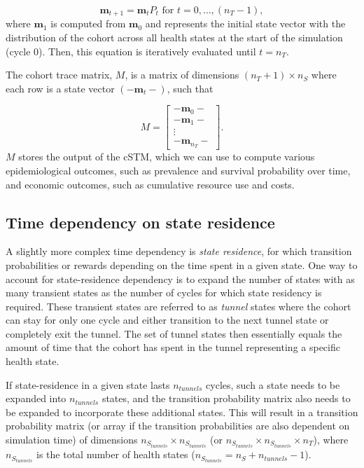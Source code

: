 \documentclass[
]{article}
\begin{document}
\[
  \mathbf{m}_{t+1} = \mathbf{m}_{t} P_t \text{ for } t = 0,\ldots, (n_T - 1),
\]
where \(\mathbf{m}_1\) is computed from \(\mathbf{m}_{0}\) and represents the initial state vector with the distribution of the cohort across all health states at the start of the simulation (cycle 0). Then, this equation is iteratively evaluated until \(t = n_T\).

The cohort trace matrix, \(M\), is a matrix of dimensions \((n_T+1) \times n_S\) where each row is a state vector \((-\mathbf{m}_{t}-)\), such that

\[
  M = 
  \begin{bmatrix}
    - \mathbf{m}_0 -  \\
    - \mathbf{m}_1 -  \\
     \vdots \\
    - \mathbf{m}_{n_T} -  
  \end{bmatrix}. 
\]
\(M\) stores the output of the cSTM, which we can use to compute various epidemiological outcomes, such as prevalence and survival probability over time, and economic outcomes, such as cumulative resource use and costs.

\hypertarget{time-dependency-on-state-residence}{%
\subsection{Time dependency on state residence}\label{time-dependency-on-state-residence}}

A slightly more complex time dependency is \emph{state residence}, for which transition probabilities or rewards depending on the time spent in a given state. One way to account for state-residence dependency is to expand the number of states with as many transient states as the number of cycles for which state residency is required. These transient states are referred to as \emph{tunnel} states where the cohort can stay for only one cycle and either transition to the next tunnel state or completely exit the tunnel. The set of tunnel states then essentially equals the amount of time that the cohort has spent in the tunnel representing a specific health state.

If state-residence in a given state lasts \(n_{tunnels}\) cycles, such a state needs to be expanded into \(n_{tunnels}\) states, and the transition probability matrix also needs to be expanded to incorporate these additional states. This will result in a transition probability matrix (or array if the transition probabilities are also dependent on simulation time) of dimensions \(n_{S_{tunnels}} \times n_{S_{tunnels}}\) (or \(n_{S_{tunnels}} \times n_{S_{tunnels}} \times n_T\)), where \(n_{S_{tunnels}}\) is the total number of health states (\(n_{S_{tunnels}} = n_S + n_{tunnels} - 1\)).
\end{document}
